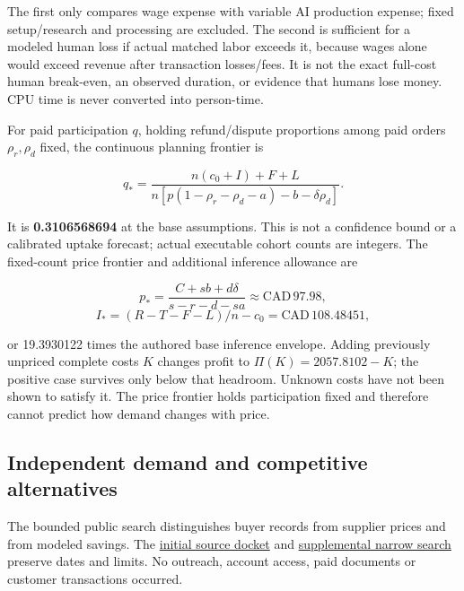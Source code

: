 \documentclass[
  11pt,
]{article}
\begin{document}
The first only compares wage expense with variable AI production
expense; fixed setup/research and processing are excluded. The second is
sufficient for a modeled human loss if actual matched labor exceeds it,
because wages alone would exceed revenue after transaction losses/fees.
It is not the exact full-cost human break-even, an observed duration, or
evidence that humans lose money. CPU time is never converted into
person-time.

For paid participation \(q\), holding refund/dispute proportions among
paid orders \(\rho_r,\rho_d\) fixed, the continuous planning frontier is

\[
q_* = \frac{n(c_0+I)+F+L}
 {n[p(1-\rho_r-\rho_d-a)-b-\delta\rho_d]}.
\]

It is \textbf{0.3106568694} at the base assumptions. This is not a
confidence bound or a calibrated uptake forecast; actual executable
cohort counts are integers. The fixed-count price frontier and
additional inference allowance are

\[
p_* = \frac{C+sb+d\delta}{s-r-d-sa}
 \approx\mathrm{CAD}\,97.98,
\] \[
I_* = (R-T-F-L)/n-c_0
 =\mathrm{CAD}\,108.48451,
\]

or 19.3930122 times the authored base inference envelope. Adding
previously unpriced complete costs \(K\) changes profit to
\(\Pi(K)=2057.8102-K\); the positive case survives only below that
headroom. Unknown costs have not been shown to satisfy it. The price
frontier holds participation fixed and therefore cannot predict how
demand changes with price.

\hypertarget{independent-demand-and-competitive-alternatives}{%
\subsection{Independent demand and competitive
alternatives}\label{independent-demand-and-competitive-alternatives}}

The bounded public search distinguishes buyer records from supplier
prices and from modeled savings. The
\href{https://github.com/MontrealAI/AGI-Alpha-Invention-Flywheel-Lab/blob/b0d828309f14ef4dc278dc522739df85db43c460/research/next009/commerce/source_docket.json}{initial
source docket} and
\href{https://github.com/MontrealAI/AGI-Alpha-Invention-Flywheel-Lab/blob/b0d828309f14ef4dc278dc522739df85db43c460/research/next009/commerce/NARROW_MARKET_SEARCH.json}{supplemental
narrow search} preserve dates and limits. No outreach, account access,
paid documents or customer transactions occurred.
\end{document}

